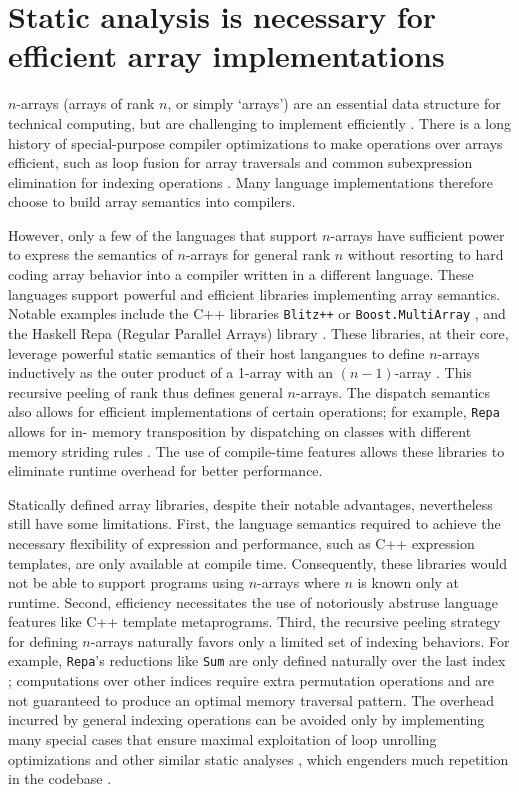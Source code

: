 \documentclass[preprint]{sigplanconf}
\newcommand{\code}[1]{\texttt{#1}}
\begin{document}
\section{Static analysis is necessary for efficient array implementations}

$n$-arrays (arrays of rank $n$, or simply `arrays') are an essential data
structure for technical computing, but are challenging to implement
efficiently \cite{Sattley:1960as,Sattley:1961as, Randell:1964a6}. There is a
long history of special-purpose compiler optimizations to make operations over
arrays efficient, such as loop fusion for array traversals and common
subexpression elimination for indexing operations \cite{Randell:1964a6,
Busam:1969oe}. Many language implementations therefore choose to build array
semantics into compilers.

However, only a few of the languages that support $n$-arrays have sufficient
power to express the semantics of $n$-arrays for general rank $n$ without
resorting to hard coding array behavior into a compiler written in a different
language. These languages support powerful and efficient libraries
implementing array semantics. Notable examples  include the C++ libraries
\code{Blitz++} \cite{Veldhuizen:1998ab} or \code{Boost.MultiArray}
\cite{Garcia:2005ma}, and the Haskell Repa (Regular Parallel Arrays) library
\cite{Keller:2010rs,Lippmeier:2011ep, Lippmeier:2012gp}. These libraries, at
their core, leverage powerful static semantics of their host langangues to
define $n$-arrays inductively as the outer product of a 1-array with an
$(n-1)$-array \cite{Bavestrelli:2000ct}. This recursive peeling of rank thus
defines general $n$-arrays. The dispatch semantics also allows for efficient
implementations of certain operations; for example, \code{Repa} allows for in-
memory transposition by dispatching on classes with different memory striding
rules \cite{Keller:2010rs}. The use of compile-time features allows these
libraries to eliminate runtime overhead for better performance.

Statically defined array libraries, despite their notable advantages,
nevertheless still have some limitations. First, the language semantics
required to achieve the necessary flexibility of expression and performance,
such as C++ expression templates, are only available at compile time.
Consequently, these libraries would not be able to support programs using
$n$-arrays where $n$ is known only at runtime. Second, efficiency necessitates
the use of notoriously abstruse language features like C++ template
metaprograms. Third, the recursive peeling strategy for defining $n$-arrays
naturally favors only a limited set of indexing behaviors. For example,
\code{Repa}'s reductions like \code{Sum} are only defined naturally over the
last index \cite{Keller:2010rs}; computations over other indices require extra
permutation operations and are not guaranteed to produce an optimal memory
traversal pattern. The overhead incurred by general indexing operations can be
avoided only by implementing many special cases that ensure maximal
exploitation of loop unrolling optimizations and other similar static analyses
\cite{Garcia:2005ma, Lippmeier:2011ep}, which engenders much repetition in the
codebase \cite{Lippmeier:2012gp}.
\end{document}
